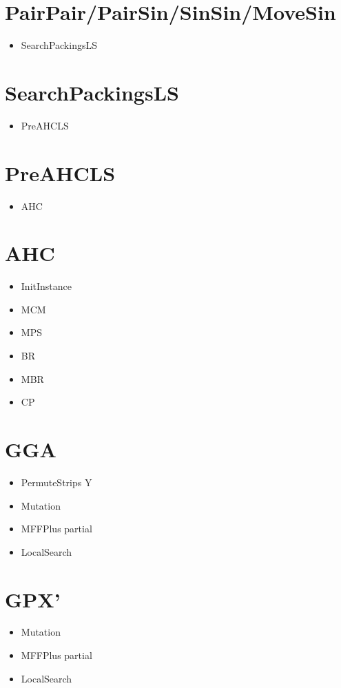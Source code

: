 \documentclass{elsarticle}
\begin{document}
\section{PairPair/PairSin/SinSin/MoveSin}
\begin{itemize}
	\item SearchPackingsLS
\end{itemize}

\section{SearchPackingsLS}
\begin{itemize}
	\item PreAHCLS
\end{itemize}

\section{PreAHCLS}
\begin{itemize}
	\item AHC
\end{itemize}

\section{AHC}
\begin{itemize}
	\item InitInstance
	\item MCM
	\item MPS
	\item BR
	\item MBR
	\item CP
\end{itemize}

\section{GGA}
\begin{itemize}
	\item PermuteStrips Y
	\item Mutation
	\item MFFPlus partial
	\item LocalSearch
\end{itemize}

\section{GPX'}
\begin{itemize}
	\item Mutation
	\item MFFPlus partial
	\item LocalSearch
\end{itemize}
\end{document}
